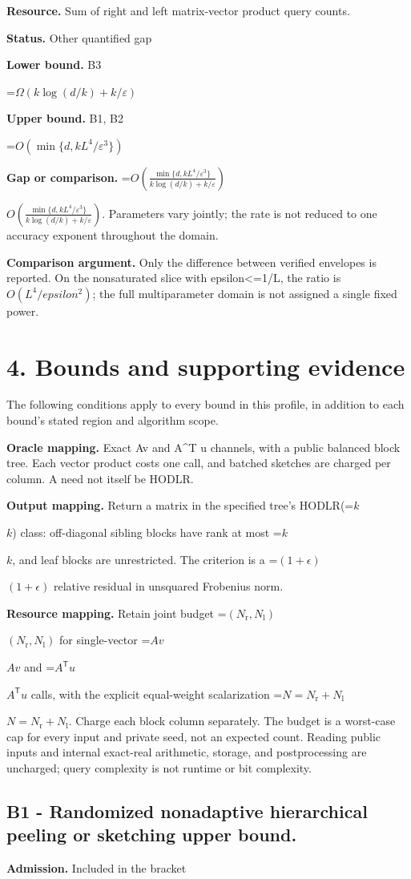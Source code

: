 \documentclass[10pt,a4paper]{article}
\newcommand{\AtlasMath}[1]{\par\begingroup\centering\setbox0=\hbox{$\displaystyle #1$}\ifdim\wd0>1.4\linewidth\typeout{ATLAS WIDE FORMULA: \the\wd0}\fi\ifdim\wd0>\linewidth\resizebox{\linewidth}{!}{\box0}\else\box0\fi\par\endgroup}
\newcommand{\AtlasInlineMath}[1]{\begingroup\setbox0=\hbox{$#1$}\ifdim\wd0>.4\linewidth\endgroup\AtlasMath{#1}\else\endgroup$#1$\fi}
\begin{document}
\textbf{Resource.} Sum of right and left matrix-vector product query counts.

\textbf{Status.} Other quantified gap

\textbf{Lower bound.} B3

\AtlasMath{\Omega(k\log(d/k)+k/\varepsilon)}
\textbf{Upper bound.} B1, B2

\AtlasMath{O(\min\{d,kL^4/\varepsilon^3\})}
\textbf{Gap or comparison.} \AtlasInlineMath{O\!\left(\frac{\min\{d,kL^4/\varepsilon^3\}}{k\log(d/k)+k/\varepsilon}\right)}. Parameters vary jointly; the rate is not reduced to one accuracy exponent throughout the domain.

\textbf{Comparison argument.} Only the difference between verified envelopes is reported. On the nonsaturated slice with epsilon<=1/L, the ratio is $O(L^4/epsilon^2)$; the full multiparameter domain is not assigned a single fixed power.

\section{4. Bounds and supporting evidence}
The following conditions apply to every bound in this profile, in addition to each bound's stated region and algorithm scope.

\textbf{Oracle mapping.} Exact Av and A\textasciicircum{}T u channels, with a public balanced block tree. Each vector product costs one call, and batched sketches are charged per column. A need not itself be HODLR.

\textbf{Output mapping.} Return a matrix in the specified tree's HODLR(\AtlasInlineMath{k}) class: off-diagonal sibling blocks have rank at most \AtlasInlineMath{k}, and leaf blocks are unrestricted. The criterion is a \AtlasInlineMath{(1+\epsilon)} relative residual in unsquared Frobenius norm.

\textbf{Resource mapping.} Retain joint budget \AtlasInlineMath{(N_{\mathrm r},N_{\mathrm l})} for single-vector \AtlasInlineMath{Av} and \AtlasInlineMath{A^{\mathsf T}u} calls, with the explicit equal-weight scalarization \AtlasInlineMath{N=N_{\mathrm r}+N_{\mathrm l}}. Charge each block column separately. The budget is a worst-case cap for every input and private seed, not an expected count. Reading public inputs and internal exact-real arithmetic, storage, and postprocessing are uncharged; query complexity is not runtime or bit complexity.

\subsection{B1 - Randomized nonadaptive hierarchical peeling or sketching upper bound.}
\textbf{Admission.} Included in the bracket
\end{document}
